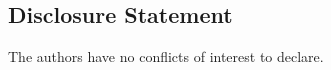 \documentclass[]{hdsr}
\begin{document}


\subsection*{Disclosure Statement}
The authors have no conflicts of interest to declare.


 










\printbibliography
\end{document}
